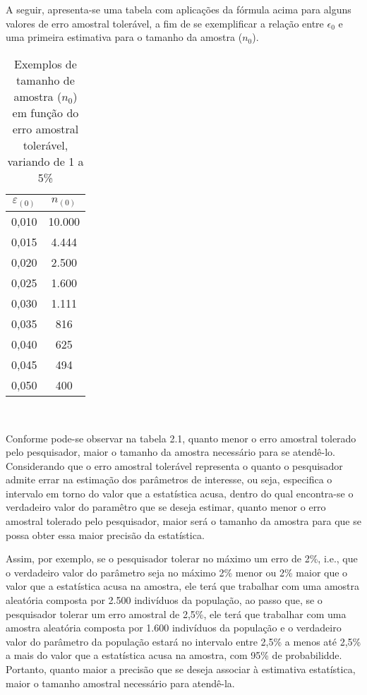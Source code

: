 A seguir, apresenta-se uma tabela com aplicações da fórmula acima para alguns valores de erro amostral tolerável, a fim de se exemplificar a relação entre $\epsilon_{0}$ e uma primeira estimativa para o tamanho da amostra ($n_{0}$).

\newpage


\begin{table}[!htb]
    \centering
    {
    \caption{Exemplos de tamanho de amostra ($n_{0}$) em função do erro amostral tolerável, variando de 1 a 5\%}
    \label{amostras}
    \vspace{0.1cm}
\begin{tabular}{c|c}
  \hline\hline
  $\varepsilon_{(0)}$   & $n_{(0)}$ \\
  \hline\hline
  0,010    &  10.000 \\
  0,015    &  4.444 \\
  0,020    &  2.500 \\
  0,025    &  1.600 \\
  0,030    &  1.111 \\
  0,035    &  816 \\
  0,040    &  625 \\
  0,045    &  494 \\
  0,050    &  400 \\
  \hline\hline
\end{tabular}}
\\
\hspace{-1.0cm}
\end{table}


Conforme pode-se observar na tabela 2.1, quanto menor o erro
amostral tolerado pelo pesquisador, maior o tamanho da amostra
necessário para se atendê-lo. Considerando que o erro amostral
tolerável representa o quanto o pesquisador admite errar na
estimação dos parâmetros de interesse, ou seja, especifica o
intervalo em torno do valor que a estatística acusa, dentro do
qual encontra-se o verdadeiro valor do paramêtro que se deseja
estimar, quanto menor o erro amostral tolerado pelo pesquisador,
maior será o tamanho da amostra para que se possa obter essa maior
precisão da estatística.\vskip0.3cm



Assim, por exemplo, se o pesquisador tolerar no máximo um erro de 2\%, i.e., que o verdadeiro valor do parâmetro seja no máximo 2\% menor ou 2\% maior que o valor que a estatística acusa na amostra, ele terá que trabalhar com uma amostra aleatória composta por 2.500 indivíduos da população, ao passo que, se o pesquisador tolerar um erro amostral de 2,5\%, ele terá que trabalhar com uma amostra aleatória composta por 1.600 indivíduos da população e o verdadeiro valor do parâmetro da população estará no intervalo entre 2,5\% a menos até 2,5\% a mais do valor que a estatística acusa na amostra, com 95\% de probabilidde. Portanto, quanto maior a precisão que se deseja associar à estimativa estatística, maior o tamanho amostral necessário para atendê-la.\vskip0.3cm



